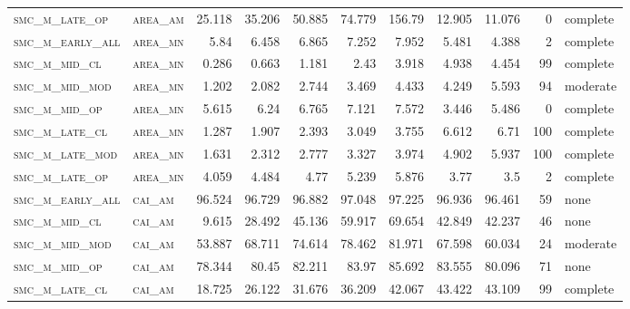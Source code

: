 \begin{landscape}
\begin{center}
\begin{footnotesize}
\begin{longtable}{llrrrrr|rrr}
\textsc{smc\_m\_late\_op  } & \textsc{area\_am  }   & 25.118   & 35.206   & 50.885   & 74.779   & 156.79   & 12.905      & 11.076        & 0             & complete     \\
\textsc{smc\_m\_early\_all} & \textsc{area\_mn  }   & 5.84     & 6.458    & 6.865    & 7.252    & 7.952    & 5.481       & 4.388         & 2             & complete \\
\textsc{smc\_m\_mid\_cl   } & \textsc{area\_mn  }   & 0.286    & 0.663    & 1.181    & 2.43     & 3.918    & 4.938       & 4.454         & 99            & complete \\
\textsc{smc\_m\_mid\_mod  } & \textsc{area\_mn  }   & 1.202    & 2.082    & 2.744    & 3.469    & 4.433    & 4.249       & 5.593         & 94            & moderate \\
\textsc{smc\_m\_mid\_op   } & \textsc{area\_mn  }   & 5.615    & 6.24     & 6.765    & 7.121    & 7.572    & 3.446       & 5.486         & 0             & complete     \\
\textsc{smc\_m\_late\_cl  } & \textsc{area\_mn  }   & 1.287    & 1.907    & 2.393    & 3.049    & 3.755    & 6.612       & 6.71          & 100           & complete \\
\textsc{smc\_m\_late\_mod } & \textsc{area\_mn  }   & 1.631    & 2.312    & 2.777    & 3.327    & 3.974    & 4.902       & 5.937         & 100           & complete \\
\textsc{smc\_m\_late\_op  } & \textsc{area\_mn  }   & 4.059    & 4.484    & 4.77     & 5.239    & 5.876    & 3.77        & 3.5           & 2             & complete \\
\textsc{smc\_m\_early\_all} & \textsc{cai\_am   }   & 96.524   & 96.729   & 96.882   & 97.048   & 97.225   & 96.936      & 96.461        & 59            & none \\
\textsc{smc\_m\_mid\_cl   } & \textsc{cai\_am   }   & 9.615    & 28.492   & 45.136   & 59.917   & 69.654   & 42.849      & 42.237        & 46            & none \\
\textsc{smc\_m\_mid\_mod  } & \textsc{cai\_am   }   & 53.887   & 68.711   & 74.614   & 78.462   & 81.971   & 67.598      & 60.034        & 24            & moderate \\
\textsc{smc\_m\_mid\_op   } & \textsc{cai\_am   }   & 78.344   & 80.45    & 82.211   & 83.97    & 85.692   & 83.555      & 80.096        & 71            & none \\
\textsc{smc\_m\_late\_cl  } & \textsc{cai\_am   }   & 18.725   & 26.122   & 31.676   & 36.209   & 42.067   & 43.422      & 43.109        & 99            & complete \\

\end{longtable}
\end{footnotesize}
\end{center}
\end{landscape}
